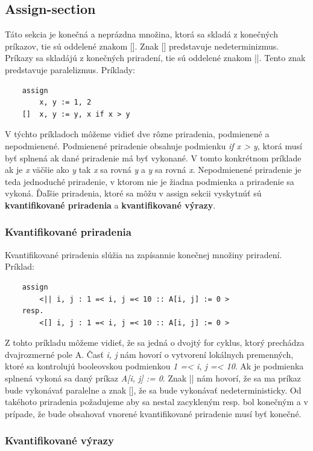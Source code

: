 \subsection{Assign-section}
Táto sekcia je konečná a neprázdna množina, ktorá sa skladá z konečných príkazov, tie sú oddelené znakom []. 
Znak [] predstavuje nedeterminizmus. Príkazy sa skladájú z konečných priradení, tie sú oddelené znakom ||.
Tento znak predstavuje paralelizmus. Príklady:
\begin{lstlisting}
	assign
		x, y := 1, 2 
	[]	x, y := y, x if x > y	
\end{lstlisting}

V týchto príkladoch môžeme vidieť dve rôzne priradenia, podmienené a nepodmienené. 
Podmienené priradenie obsahuje podmienku \textit{if x > y}, ktorá musí byť splnená ak dané priradenie má byť vykonané.
V tomto konkrétnom príklade ak je \textit{x} väčšie ako \textit{y} tak \textit{x} sa rovná \textit{y} a \textit{y} sa rovná \textit{x}.
Nepodmienené priradenie je teda jednoduché priradenie, v ktorom nie je žiadna podmienka a priradenie sa vykoná.
Ďaľšie priradenia, ktoré sa môžu v assign sekcii vyskytnúť sú \textbf{kvantifikované priradenia} a \textbf{kvantifikované výrazy}.

\subsubsection{Kvantifikované priradenia}

Kvantifikované priradenia slúžia na zapísannie konečnej množiny priradení. Príklad:
\begin{lstlisting}
	assign
		<|| i, j : 1 =< i, j =< 10 :: A[i, j] := 0 >
	resp.
		<[] i, j : 1 =< i, j =< 10 :: A[i, j] := 0 >
\end{lstlisting}
Z tohto príkladu môžeme vidieť, že sa jedná o dvojtý for cyklus, ktorý prechádza dvajrozmerné pole A. 
Časť \textit{i, j} nám hovorí o vytvorení lokálnych premenných, ktoré sa kontrolujú booleovskou podmienkou \textit{1 =< i, j =< 10}.
Ak je podmienka splnená vykoná sa daný príkaz \textit{A[i, j] := 0}. 
Znak || nám hovorí, že sa ma príkaz bude vykonávať paralelne a znak [], že sa bude vykonávať nedeterministicky.
Od takéhoto priradenia požadujeme aby sa nestal zacykleným resp. bol konečným 
a v prípade, že bude obsahovať vnorené kvantifikované priradenie musí byť konečné.

\subsubsection{Kvantifikované výrazy}

